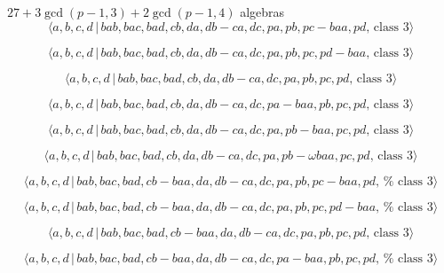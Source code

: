 \documentclass[10pt]{article}
\begin{document}
$27+3\gcd (p-1,3)+2\gcd (p-1,4)$ algebras%
\begin{equation}
\langle a,b,c,d\,|\,bab,bac,bad,cb,da,db-ca,dc,pa,pb,pc-baa,pd,\,\text{class 
}3\rangle  \tag{7.4291}
\end{equation}

\begin{equation}
\langle a,b,c,d\,|\,bab,bac,bad,cb,da,db-ca,dc,pa,pb,pc,pd-baa,\,\text{class 
}3\rangle  \tag{7.4292}
\end{equation}

\begin{equation}
\langle a,b,c,d\,|\,bab,bac,bad,cb,da,db-ca,dc,pa,pb,pc,pd,\,\text{class }%
3\rangle  \tag{7.4293}
\end{equation}

\begin{equation}
\langle a,b,c,d\,|\,bab,bac,bad,cb,da,db-ca,dc,pa-baa,pb,pc,pd,\,\text{class 
}3\rangle  \tag{7.4294}
\end{equation}

\begin{equation}
\langle a,b,c,d\,|\,bab,bac,bad,cb,da,db-ca,dc,pa,pb-baa,pc,pd,\,\text{class 
}3\rangle  \tag{7.4295}
\end{equation}

\begin{equation}
\langle a,b,c,d\,|\,bab,bac,bad,cb,da,db-ca,dc,pa,pb-\omega baa,pc,pd,\,%
\text{class }3\rangle  \tag{7.4296}
\end{equation}

\begin{equation}
\langle a,b,c,d\,|\,bab,bac,bad,cb-baa,da,db-ca,dc,pa,pb,pc-baa,pd,\,\text{%
class }3\rangle  \tag{7.4297}
\end{equation}

\begin{equation}
\langle a,b,c,d\,|\,bab,bac,bad,cb-baa,da,db-ca,dc,pa,pb,pc,pd-baa,\,\text{%
class }3\rangle  \tag{7.4298}
\end{equation}

\begin{equation}
\langle a,b,c,d\,|\,bab,bac,bad,cb-baa,da,db-ca,dc,pa,pb,pc,pd,\,\text{class 
}3\rangle  \tag{7.4299}
\end{equation}

\begin{equation}
\langle a,b,c,d\,|\,bab,bac,bad,cb-baa,da,db-ca,dc,pa-baa,pb,pc,pd,\,\text{%
class }3\rangle  \tag{7.4300}
\end{equation}
\end{document}
